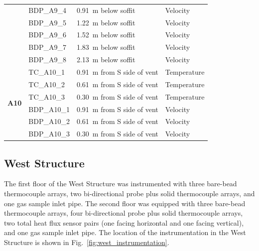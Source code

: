 \documentclass[12pt,oneside]{book}
\begin{document}
\begin{longtable}[c]{c|lll}
 & BDP\_A9\_4 & 0.91~m below soffit  & Velocity \\
 & BDP\_A9\_5 & 1.22~m below soffit  & Velocity \\
 & BDP\_A9\_6 & 1.52~m below soffit  & Velocity \\
 & BDP\_A9\_7 & 1.83~m below soffit  & Velocity \\
 & BDP\_A9\_8 & 2.13~m below soffit  & Velocity \\
\midrule
\multirow{6}{*}{\large{\textbf{A10}}}
 & TC\_A10\_1 & 0.91~m from S side of vent & Temperature \\
 & TC\_A10\_2 & 0.61~m from S side of vent & Temperature \\
 & TC\_A10\_3 & 0.30~m from S side of vent & Temperature \\
\cline{2-4}
 & BDP\_A10\_1 & 0.91~m from S side of vent & Velocity \\
 & BDP\_A10\_2 & 0.61~m from S side of vent & Velocity \\
 & BDP\_A10\_3 & 0.30~m from S side of vent & Velocity \\
\bottomrule
\end{longtable}
\clearpage

\subsection{West Structure}
The first floor of the West Structure was instrumented with three bare-bead thermocouple arrays, two bi-directional probe plus solid thermocouple arrays, and one gas sample inlet pipe. The second floor was equipped with three bare-bead thermocouple arrays, four bi-directional probe plus solid thermocouple arrays, two total heat flux sensor pairs (one facing horizontal and one facing vertical), and one gas sample inlet pipe. The location of the instrumentation in the West Structure is shown in Fig.~\ref{fig:west_instrumentation}.
\end{document}
